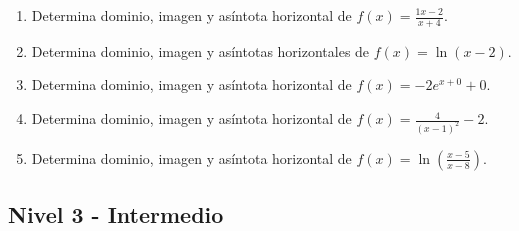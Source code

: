 \documentclass[11pt,a4paper]{article}
\begin{document}
\begin{enumerate}[label=\textbf{E\arabic*.},start=21]
\item Determina dominio, imagen y asíntota horizontal de $f(x)=\frac{1x-2}{x+4}$.

\item Determina dominio, imagen y asíntotas horizontales de $f(x)=\ln(x-2)$.

\item Determina dominio, imagen y asíntota horizontal de $f(x)=-2e^{x+0}+0$.

\item Determina dominio, imagen y asíntota horizontal de $f(x)=\frac{4}{(x-1)^2}-2$.

\item Determina dominio, imagen y asíntota horizontal de $f(x)=\ln\left(\frac{x-5}{x-8}\right)$.

\end{enumerate}

\newpage

\subsection{Nivel 3 - Intermedio}
\end{document}
